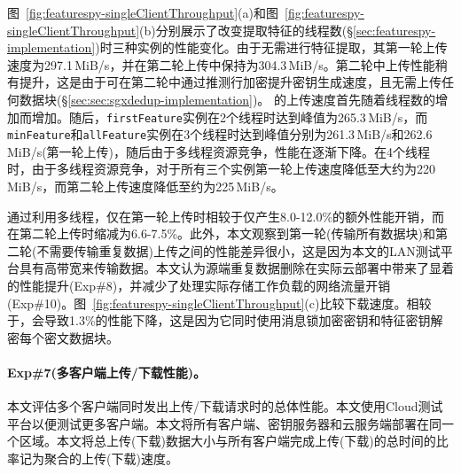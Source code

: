 图~\ref{fig:featurespy-singleClientThroughput}(a)和图~\ref{fig:featurespy-singleClientThroughput}(b)分别展示了改变提取特征的线程数(\S\ref{sec:featurespy-implementation})时\prototype 三种实例的性能变化。由于\sysnameS 无需进行特征提取，其第一轮上传速度为297.1\,MiB/s，并在第二轮上传中保持为304.3\,MiB/s。第二轮中上传性能稍有提升，这是由于\sysnameS 可在第二轮中通过推测行加密提升密钥生成速度，且无需上传任何数据块(\S\ref{sec:sec:sgxdedup-implementation})。
\prototype 的上传速度首先随着线程数的增加而增加。随后，{\tt firstFeature}实例在2个线程时达到峰值为265.3\,MiB/s，而{\tt minFeature}和{\tt allFeature}实例在3个线程时达到峰值分别为261.3\,MiB/s和262.6\,MiB/s(第一轮上传)，随后由于多线程资源竞争，性能在逐渐下降。在4个线程时，由于多线程资源竞争，对于所有三个实例第一轮上传速度降低至大约为220\,MiB/s，而第二轮上传速度降低至约为225\,MiB/s。

通过利用多线程，\prototype 仅在第一轮上传时相较于\sysnameS 仅产生8.0-12.0\%的额外性能开销，而在第二轮上传时缩减为6.6-7.5\%。此外，本文观察到第一轮(传输所有数据块)和第二轮(不需要传输重复数据)上传之间的性能差异很小，这是因为本文的LAN测试平台具有高带宽来传输数据。本文认为源端重复数据删除在实际云部署中带来了显着的性能提升(Exp\#8)，并减少了处理实际存储工作负载的网络流量开销(Exp\#10)。图~\ref{fig:featurespy-singleClientThroughput}(c)比较下载速度。相较于\sysnameS，\prototype 会导致1.3\%的性能下降，这是因为它同时使用消息锁加密密钥和特征密钥解密每个密文数据块。

\paragraph*{Exp\#7(多客户端上传/下载性能)。}
本文评估多个客户端同时发出上传/下载请求时的总体性能。本文使用Cloud测试平台以便测试更多客户端。本文将所有客户端、密钥服务器和云服务端部署在同一个区域。本文将总上传(下载)数据大小与所有客户端完成上传(下载)的总时间的比率记为聚合的上传(下载)速度。

